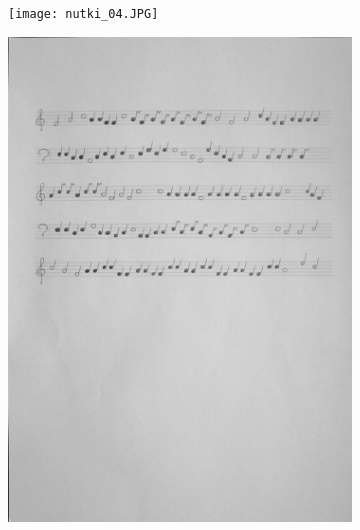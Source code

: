 \documentclass{article}
\begin{document}
\begin{figure}
    \centering
    \begin{subfigure}{.5\textwidth}
        \centering
        \graphicspath{ {Resources/} }
        \texttt{[image: nutki\_04.JPG]}
        \label{fig:sub1}
    \end{subfigure}%
    \begin{subfigure}{.5\textwidth}
        \centering
        \graphicspath{ {output/} }
        \includegraphics[width=.9\linewidth]{warped4_gray.jpg}
        \label{fig:sub2}
    \end{subfigure}
    \label{fig:test}
\end{figure}
\end{document}
